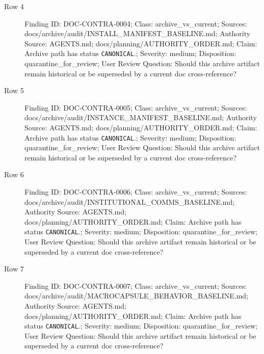 \documentclass[10.5pt,a4paper,openany]{book}
\begin{document}
\begin{description}
\item[Row 4] Finding ID: DOC-\allowbreak{}CONTRA-\allowbreak{}0004; Class: archive\_\allowbreak{}vs\_\allowbreak{}current; Sources: docs/\allowbreak{}archive/\allowbreak{}audit/\allowbreak{}INSTALL\_\allowbreak{}MANIFEST\_\allowbreak{}BASELINE.\allowbreak{}md; Authority Source: AGENTS.\allowbreak{}md; docs/\allowbreak{}planning/\allowbreak{}AUTHORITY\_\allowbreak{}ORDER.\allowbreak{}md; Claim: Archive path has status \texttt{CANONICAL}.\allowbreak{}; Severity: medium; Disposition: quarantine\_\allowbreak{}for\_\allowbreak{}review; User Review Question: Should this archive artifact remain historical or be superseded by a current doc cross-\allowbreak{}reference?
\item[Row 5] Finding ID: DOC-\allowbreak{}CONTRA-\allowbreak{}0005; Class: archive\_\allowbreak{}vs\_\allowbreak{}current; Sources: docs/\allowbreak{}archive/\allowbreak{}audit/\allowbreak{}INSTANCE\_\allowbreak{}MANIFEST\_\allowbreak{}BASELINE.\allowbreak{}md; Authority Source: AGENTS.\allowbreak{}md; docs/\allowbreak{}planning/\allowbreak{}AUTHORITY\_\allowbreak{}ORDER.\allowbreak{}md; Claim: Archive path has status \texttt{CANONICAL}.\allowbreak{}; Severity: medium; Disposition: quarantine\_\allowbreak{}for\_\allowbreak{}review; User Review Question: Should this archive artifact remain historical or be superseded by a current doc cross-\allowbreak{}reference?
\item[Row 6] Finding ID: DOC-\allowbreak{}CONTRA-\allowbreak{}0006; Class: archive\_\allowbreak{}vs\_\allowbreak{}current; Sources: docs/\allowbreak{}archive/\allowbreak{}audit/\allowbreak{}INSTITUTIONAL\_\allowbreak{}COMMS\_\allowbreak{}BASELINE.\allowbreak{}md; Authority Source: AGENTS.\allowbreak{}md; docs/\allowbreak{}planning/\allowbreak{}AUTHORITY\_\allowbreak{}ORDER.\allowbreak{}md; Claim: Archive path has status \texttt{CANONICAL}.\allowbreak{}; Severity: medium; Disposition: quarantine\_\allowbreak{}for\_\allowbreak{}review; User Review Question: Should this archive artifact remain historical or be superseded by a current doc cross-\allowbreak{}reference?
\item[Row 7] Finding ID: DOC-\allowbreak{}CONTRA-\allowbreak{}0007; Class: archive\_\allowbreak{}vs\_\allowbreak{}current; Sources: docs/\allowbreak{}archive/\allowbreak{}audit/\allowbreak{}MACROCAPSULE\_\allowbreak{}BEHAVIOR\_\allowbreak{}BASELINE.\allowbreak{}md; Authority Source: AGENTS.\allowbreak{}md; docs/\allowbreak{}planning/\allowbreak{}AUTHORITY\_\allowbreak{}ORDER.\allowbreak{}md; Claim: Archive path has status \texttt{CANONICAL}.\allowbreak{}; Severity: medium; Disposition: quarantine\_\allowbreak{}for\_\allowbreak{}review; User Review Question: Should this archive artifact remain historical or be superseded by a current doc cross-\allowbreak{}reference?

\end{description}
\end{document}
